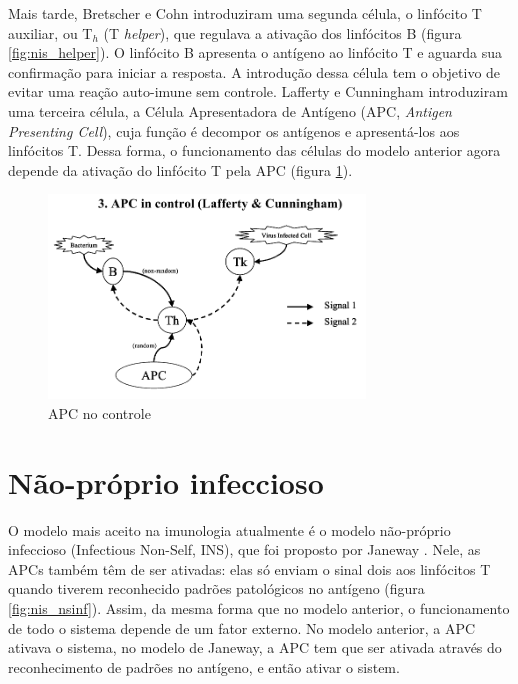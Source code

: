 Mais tarde, Bretscher e Cohn introduziram uma segunda célula, o linfócito T auxiliar, ou T$_{h}$ (T \emph{helper}), que regulava a ativação dos linfócitos B (figura \ref{fig:nis_helper}). O linfócito B apresenta o antígeno ao linfócito T e aguarda sua confirmação para iniciar a resposta. A introdução dessa célula tem o objetivo de evitar uma reação auto-imune sem controle. Lafferty e Cunningham introduziram uma terceira célula, a Célula Apresentadora de Antígeno (APC, \emph{Antigen Presenting Cell}), cuja função é decompor os antígenos e apresentá-los aos linfócitos T. Dessa forma, o funcionamento das células do modelo anterior agora depende da ativação do linfócito T pela APC (figura \ref{fig:nis_apc}).

\begin{figure}[h!]
    \vspace{1cm}
    \centering
    \includegraphics[width=0.75\textwidth]{img/signals3-apc.png}
    \caption{APC no controle \cite{Aickelin2002}}
    \label{fig:nis_apc}
    \vspace{1cm}
\end{figure}

\section{Não-próprio infeccioso}

O modelo mais aceito na imunologia atualmente é o modelo não-próprio infeccioso (Infectious Non-Self, INS), que foi proposto por Janeway \cite{Janeway1989}. Nele, as APCs também têm de ser ativadas: elas só enviam o sinal dois aos linfócitos T quando tiverem reconhecido padrões patológicos no antígeno (figura \ref{fig:nis_nsinf}). Assim, da mesma forma que no modelo anterior, o funcionamento de todo o sistema depende de um fator externo. No modelo anterior, a APC ativava o sistema, no modelo de Janeway, a APC tem que ser ativada através do reconhecimento de padrões no antígeno, e então ativar o sistem.

